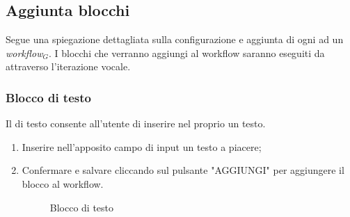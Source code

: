 \newpage
\subsection{Aggiunta blocchi}
Segue una spiegazione dettagliata sulla configurazione e aggiunta di ogni ad un \textit{workflow$_{G}$}.
I blocchi che verranno aggiungi al workflow saranno eseguiti da attraverso l'iterazione vocale.
\subsubsection{Blocco di testo}
Il di testo consente all'utente di inserire nel proprio un testo.
\begin{enumerate}
	\item Inserire nell'apposito campo di input un testo a piacere;
	\item Confermare e salvare cliccando sul pulsante "AGGIUNGI" per aggiungere il blocco al workflow.
	\begin{figure}[!ht]
		\centering
		\caption{Blocco di testo}
	\end{figure}
\end{enumerate}
\newpage
